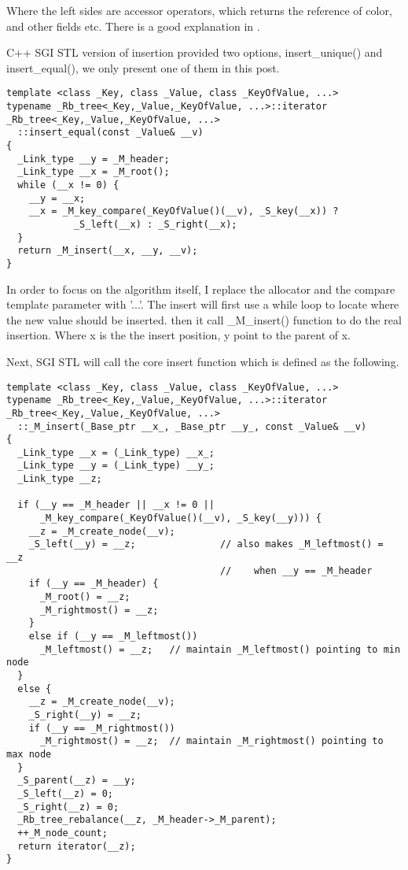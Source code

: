 \documentclass{article}
\begin{document}
Where the left sides are accessor operators, which returns the
reference of color, and other fields etc. There is a good explanation
in \cite{hj-stl}.

C++ SGI STL version of insertion provided two options,
insert\_unique() and insert\_equal(), we only present one of them in
this post.

\begin{lstlisting}
template <class _Key, class _Value, class _KeyOfValue, ...>
typename _Rb_tree<_Key,_Value,_KeyOfValue, ...>::iterator
_Rb_tree<_Key,_Value,_KeyOfValue, ...>
  ::insert_equal(const _Value& __v)
{
  _Link_type __y = _M_header;
  _Link_type __x = _M_root();
  while (__x != 0) {
    __y = __x;
    __x = _M_key_compare(_KeyOfValue()(__v), _S_key(__x)) ? 
            _S_left(__x) : _S_right(__x);
  }
  return _M_insert(__x, __y, __v);
}
\end{lstlisting}

In order to focus on the algorithm itself, I replace the allocator and
the compare template parameter with '...'. The insert will first use a 
while loop to locate where the new value should be inserted. then it
call \_M\_insert() function to do the real insertion. Where x is the
the insert position, y point to the parent of x.

Next, SGI STL will call the core insert function which is defined as
the following.

\begin{lstlisting}
template <class _Key, class _Value, class _KeyOfValue, ...>
typename _Rb_tree<_Key,_Value,_KeyOfValue, ...>::iterator
_Rb_tree<_Key,_Value,_KeyOfValue, ...>
  ::_M_insert(_Base_ptr __x_, _Base_ptr __y_, const _Value& __v)
{
  _Link_type __x = (_Link_type) __x_;
  _Link_type __y = (_Link_type) __y_;
  _Link_type __z;

  if (__y == _M_header || __x != 0 || 
      _M_key_compare(_KeyOfValue()(__v), _S_key(__y))) {
    __z = _M_create_node(__v);
    _S_left(__y) = __z;               // also makes _M_leftmost() = __z 
                                      //    when __y == _M_header
    if (__y == _M_header) {
      _M_root() = __z;
      _M_rightmost() = __z;
    }
    else if (__y == _M_leftmost())
      _M_leftmost() = __z;   // maintain _M_leftmost() pointing to min node
  }
  else {
    __z = _M_create_node(__v);
    _S_right(__y) = __z;
    if (__y == _M_rightmost())
      _M_rightmost() = __z;  // maintain _M_rightmost() pointing to max node
  }
  _S_parent(__z) = __y;
  _S_left(__z) = 0;
  _S_right(__z) = 0;
  _Rb_tree_rebalance(__z, _M_header->_M_parent);
  ++_M_node_count;
  return iterator(__z);
}
\end{lstlisting}
\end{document}
